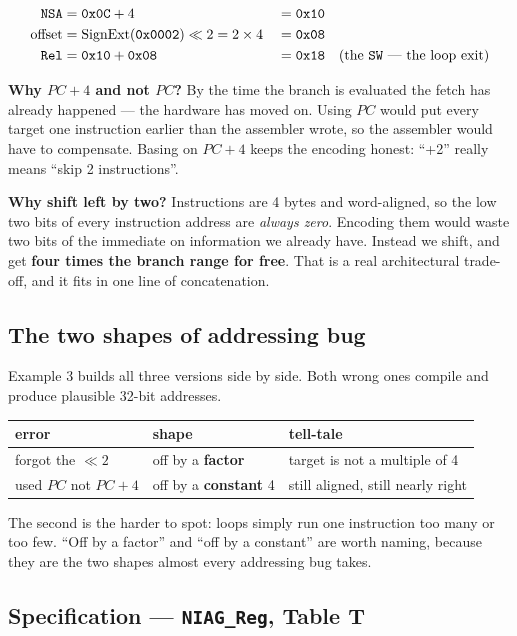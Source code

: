 \documentclass[11pt]{article}
\newcommand{\code}[1]{\texttt{#1}}
\begin{document}
\begin{align*}
\code{NSA}    &= \code{0x0C} + 4 &&= \code{0x10}\\
\text{offset} &= \text{SignExt}(\code{0x0002}) \ll 2 = 2 \times 4 &&= \code{0x08}\\
\code{Rel}    &= \code{0x10} + \code{0x08} &&= \code{0x18} \quad \text{(the \code{SW} --- the loop exit)}
\end{align*}

\textbf{Why $PC+4$ and not $PC$?} By the time the branch is evaluated the fetch
has already happened --- the hardware has moved on. Using $PC$ would put every
target one instruction earlier than the assembler wrote, so the assembler would
have to compensate. Basing on $PC+4$ keeps the encoding honest: ``+2'' really
means ``skip 2 instructions''.

\textbf{Why shift left by two?} Instructions are 4 bytes and word-aligned, so
the low two bits of every instruction address are \emph{always zero}. Encoding
them would waste two bits of the immediate on information we already have.
Instead we shift, and get \textbf{four times the branch range for free}. That is
a real architectural trade-off, and it fits in one line of concatenation.

\subsection*{The two shapes of addressing bug}

Example 3 builds all three versions side by side. Both wrong ones compile and
produce plausible 32-bit addresses.

\begin{center}
\begin{tabular}{lll}
\toprule
error & shape & tell-tale \\
\midrule
forgot the $\ll 2$ & off by a \textbf{factor} & target is not a multiple of 4 \\
used $PC$ not $PC+4$ & off by a \textbf{constant} 4 & still aligned, still nearly right \\
\bottomrule
\end{tabular}
\end{center}

The second is the harder to spot: loops simply run one instruction too many or
too few. ``Off by a factor'' and ``off by a constant'' are worth naming, because
they are the two shapes almost every addressing bug takes.

\subsection*{Specification --- \code{NIAG\_Reg}, Table T}
\end{document}
